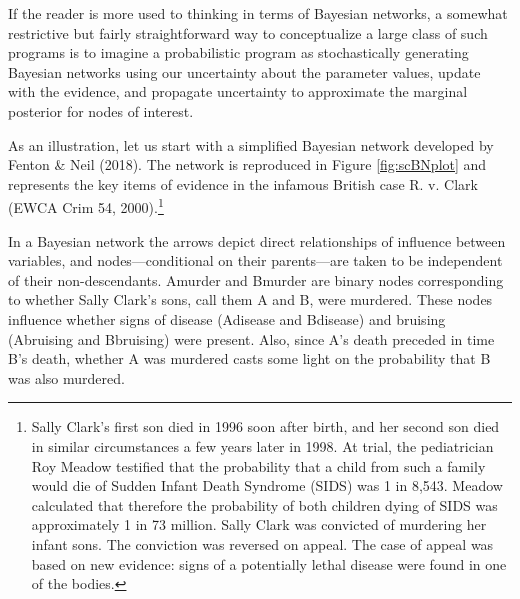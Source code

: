 \documentclass[
  10pt,
  dvipsnames,enabledeprecatedfontcommands]{scrartcl}
\begin{document}
If the reader is more used to thinking in terms of Bayesian networks, a
somewhat restrictive but fairly straightforward way to conceptualize a
large class of such programs is to imagine a probabilistic program as
stochastically generating Bayesian networks using our uncertainty about
the parameter values, update with the evidence, and propagate
uncertainty to approximate the marginal posterior for nodes of interest.

As an illustration, let us start with a simplified Bayesian network
developed by Fenton \& Neil (2018). The network is reproduced in Figure
\ref{fig:scBNplot} and represents the key items of evidence in the
infamous British case R. v. Clark (EWCA Crim 54, 2000).\footnote{Sally
  Clark's first son died in 1996 soon after birth, and her second son
  died in similar circumstances a few years later in 1998. At trial, the
  pediatrician Roy Meadow testified that the probability that a child
  from such a family would die of Sudden Infant Death Syndrome (SIDS)
  was 1 in 8,543. Meadow calculated that therefore the probability of
  both children dying of SIDS was approximately 1 in 73 million. Sally
  Clark was convicted of murdering her infant sons. The conviction was
  reversed on appeal. The case of appeal was based on new evidence:
  signs of a potentially lethal disease were found in one of the bodies.}

In a Bayesian network the arrows depict direct relationships of
influence between variables, and nodes---conditional on their
parents---are taken to be independent of their non-descendants.
\textsf{Amurder} and \textsf{Bmurder} are binary nodes corresponding to
whether Sally Clark's sons, call them A and B, were murdered. These
nodes influence whether signs of disease (\textsf{Adisease} and
\textsf{Bdisease}) and bruising (\textsf{Abruising} and
\textsf{Bbruising}) were present. Also, since A's death preceded in time
B's death, whether A was murdered casts some light on the probability
that B was also murdered.
\end{document}
